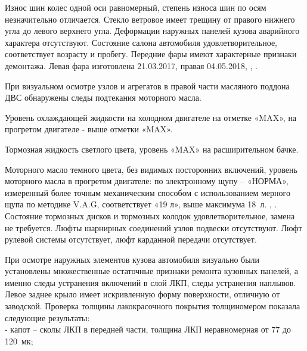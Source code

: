 {

 Износ шин колес одной оси равномерный, степень износа шин по осям незначительно отличается.   Стекло ветровое имеет трещину от правого нижнего угла до левого верхнего угла. Деформации  наружных панелей кузова аварийного характера отсутствуют. Состояние салона автомобиля удовлетворительное, соответствует возрасту и пробегу.  Передние фары имеют характерные признаки демонтажа.  Левая фара изготовлена 21.03.2017, правая 04.05.2018, , .
 
 
 При визуальном осмотре узлов и агрегатов в правой части масляного поддона ДВС обнаружены следы подтекания  моторного масла.
   
 Уровень охлаждающей жидкости на холодном двигателе на отметке «MAX», на прогретом двигателе - выше отметки «MAX». 
 
 Тормозная жидкость  светлого цвета, уровень «MAX» на расширительном бачке.
 
 Моторного масло темного цвета, без видимых посторонних включений, уровень моторного масла в прогретом двигателе: по электронному щупу – «НОРМА»,   измеренный более точным механическим способом с использованием мерного щупа по методике V.A.G,  соответствует «19 л»,  выше максимума 18~л. , . Состояние тормозных дисков и тормозных колодок удовлетворительное,  замена не требуется. Люфты шарнирных соединений узлов подвески отсутствуют. Люфт рулевой системы отсутствует,  люфт карданной передачи отсутствует. 
 
 
При осмотре наружных элементов кузова  автомобиля визуально были установлены множественные остаточные признаки ремонта кузовных панелей, а именно следы устранения включений в слой ЛКП, следы устранения наплывов. Левое заднее крыло имеет искривленную форму поверхности, отличную от заводской.  Проверка толщины лакокрасочного покрытия  толщиномером  показала следующие результаты:\\

- капот – сколы ЛКП в передней части, толщина ЛКП неравномерная от 77 до 120 мк;

}

